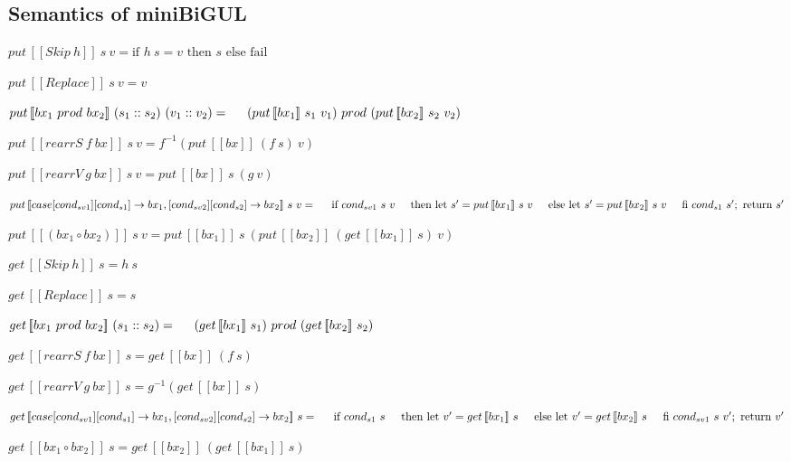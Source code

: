 \documentclass[runningheads]{llncs}
\newcommand{\tab}{\hspace*{5mm}}
\newcommand{\sif}[3]{\text{if } #1 \text{ then } #2 \text{ else } #3}
\newcommand{\product}[2]{#1 \ prod \ #2}
\newcommand{\tuple}[2]{(#1 :: #2)}
\newcommand{\rearrS}[2]{rearrS \ #1 \ #2}
\newcommand{\rearrV}[2]{rearrV \ #1 \ #2}
\newcommand{\casebx}[6]{case [#1][#2] \to #3, [#4][#5] \to #6}
\newcommand{\bxput}[3]{put \, [\![#1]\!] \ #2 \ #3}
\newcommand{\bxget}[2]{get \, [\![#1]\!] \ #2}
\begin{document}
\subsection{Semantics of miniBiGUL}

$\bxput{Skip \ h}{s}{v} = \sif{h \ s = v}{s}{\text{fail}}$

$\bxput{Replace}{s}{v} = v$

$\bxput{\product{bx_1}{bx_2}}{\tuple{s_1}{s_2}}{\tuple{v_1}{v_2}} =\\
    \tab \product{(\bxput{bx_1}{s_1}{v_1})}{(\bxput{bx_2}{s_2}{v_2})}$

$\bxput{\rearrS{f}{bx}}{s}{v} = f^{-1}(\bxput{bx}{(f \ s)}{v})$

$\bxput{\rearrV{g}{bx}}{s}{v} = \bxput{bx}{s}{(g \ v)}$

$\bxput{\casebx{cond_{sv1}}{cond_{s1}}{bx_1}{cond_{sv2}}{cond_{s2}}{bx_2}}{s}{v} = \\
    \tab \text{if } {cond_{sv1} \ s \ v} \\
    \tab \text{then let } s' = \bxput{bx_1}{s}{v} \\
    \tab \text{else let } s' = \bxput{bx_2}{s}{v} \\
    \tab \text{fi } cond_{s1} \ s'; \text{ return } s'$

$\bxput{(bx_1 \circ bx_2)}{s}{v} = \bxput{bx_1}{s}{(\bxput{bx_2}{(\bxget{bx_1}{s})}{v})}$

\vspace{5mm}

$\bxget{Skip \ h}{s} = h \ s$

$\bxget{Replace}{s} = s$

$\bxget{\product{bx_1}{bx_2}}{\tuple{s_1}{s_2}} = \\
    \tab \product{(\bxget{bx_1}{s_1})}{(\bxget{bx_2}{s_2})}$

$\bxget{\rearrS{f}{bx}}{s} = \bxget{bx}{(f \ s)}$

$\bxget{\rearrV{g}{bx}}{s} = g^{-1} (\bxget{bx}{s})$

$\bxget{\casebx{cond_{sv1}}{cond_{s1}}{bx_1}{cond_{sv2}}{cond_{s2}}{bx_2}}{s} =\\
    \tab \text{if } {cond_{s1} \ s}\\
    \tab \text{then let } v' = \bxget{bx_1}{s}\\
    \tab \text{else let } v' = \bxget{bx_2}{s}\\
    \tab \text{fi } {cond_{sv1} \ s \ v'}; \text{ return } v'$

$\bxget{bx_1 \circ bx_2}{s} = \bxget{bx_2}{(\bxget{bx_1}{s})}$
\end{document}
